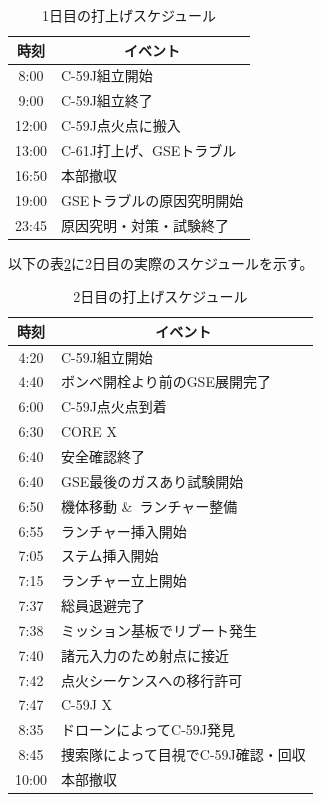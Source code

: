 \documentclass[a4paper,11pt,uplatex]{jsarticle}
\begin{document}
\begin{table}[H]
	\centering
	\caption{1日目の打上げスケジュール}
	\begin{tabular}{cl} \toprule
		時刻    & \multicolumn{1}{c}{イベント} \\ \midrule
		8:00  & C-59J組立開始                \\
		9:00  & C-59J組立終了                \\
		12:00 & C-59J点火点に搬入              \\
		13:00 & C-61J打上げ、GSEトラブル         \\
		16:50 & 本部撤収                     \\
		19:00 & GSEトラブルの原因究明開始           \\
		23:45 & 原因究明・対策・試験終了             \\
		\bottomrule
	\end{tabular}
	\label{tab:search_1nitime}
\end{table}

以下の表\ref{tab:search_2nitime}に2日目の実際のスケジュールを示す。
\begin{table}[H]
	\centering
	\caption{2日目の打上げスケジュール}
	\begin{tabular}{cl} \toprule
		時刻    & \multicolumn{1}{c}{イベント} \\ \midrule
		4:20  & C-59J組立開始                \\
		4:40  & ボンベ開栓より前のGSE展開完了         \\
		6:00  & C-59J点火点到着               \\
		6:30  & CORE X                   \\
		6:40  & 安全確認終了                   \\
		6:40  & GSE最後のガスあり試験開始           \\
		6:50  & 機体移動 \&\ ランチャー整備         \\
		6:55  & ランチャー挿入開始                \\
		7:05  & ステム挿入開始                  \\
		7:15  & ランチャー立上開始                \\
		7:37  & 総員退避完了                   \\
		7:38  & ミッション基板でリブート発生           \\
		7:40  & 諸元入力のため射点に接近             \\
		7:42  & 点火シーケンスへの移行許可            \\
		7:47  & C-59J X                  \\
		8:35  & ドローンによってC-59J発見          \\
		8:45  & 捜索隊によって目視でC-59J確認・回収     \\
		10:00 & 本部撤収                     \\
		\bottomrule
	\end{tabular}
	\label{tab:search_2nitime}
\end{table}
\end{document}
